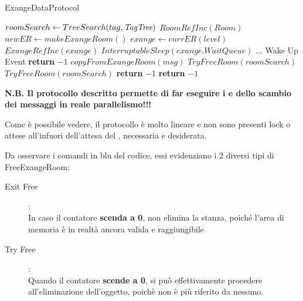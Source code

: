 \newpage

\begin{algorithm}
\caption{\Reader ExangeDataProtocol}\label{readExange}
\begin{algorithmic}[1]
\State $roomSearch \gets TreeSearch(tag, \textit{TagTree})$
    \State $RoomRefInc(Room)$
        \State $newER \gets makeExangeRoom()$
        {
        \color{red}
        \State $exange \gets currER(level)$
        \State $ExangeRefInc(exange)$
        }
        \State $InterruptableSleep(exange.WaitQueue)$
        \State ...
        \State Wake Up Event
                \State \textbf{return} $-1$
            \EndIf
        \State $copyFromExangeRoom(msg)$ 
        \State $TryFreeRoom(roomSearch)$
    \Else
        \State $TryFreeRoom(roomSearch)$
        \State \textbf{return} $-1$
    \EndIf
\Else
    \State \textbf{return} $-1$
\EndIf
\EndProcedure
\end{algorithmic}
\end{algorithm}

\textbf{N.B. Il protocollo descritto permette di far eseguire i \Writer e \Reader dello scambio dei messaggi in reale
parallelismo!!!}

Come è possibile vedere, il protocollo è molto lineare e non sono presenti lock o attese all'infuori dell'attesa del
\Reader, necessaria e desiderata.

Da osservare i comandi in {\color{blue} blu} del codice, essi evidenziano i 2 diversi tipi di FreeExangeRoom:
\begin{description}
\item[Exit Free]:\\
In caso il contatore \textbf{scenda a 0}, non elimina la stanza, poiché l'area di memoria è in realtà ancora valida e
raggiungibile
\item[Try Free]:\\
Quando il contatore \textbf{scende a 0}, si può effettivamente procedere all'eliminazione dell'oggetto, poichè non è più
riferito da nessuno.
\end{description}

